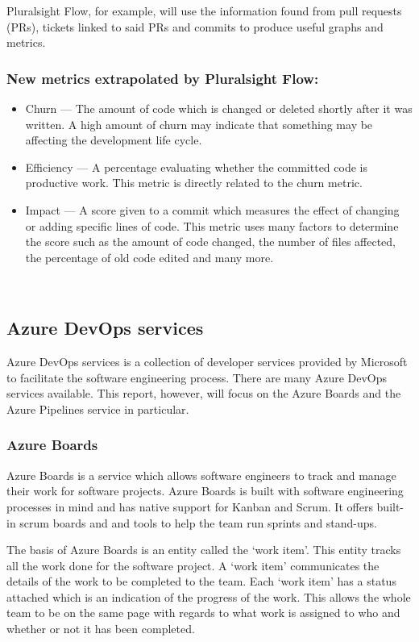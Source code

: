 \documentclass{article}
\begin{document}
Pluralsight Flow, for example, will use the information found from pull
requests (PRs), tickets linked to said PRs and commits to produce useful graphs
and metrics.

\subsubsection{New metrics extrapolated by Pluralsight Flow:}
\begin{itemize}
  \item Churn --- The amount of code which is changed or deleted shortly after
    it was written. A high amount of churn may indicate that something may be
    affecting the development life cycle.
  \item Efficiency --- A percentage evaluating whether the committed code is
    productive work. This metric is directly related to the churn metric.
  \item Impact --- A score given to a commit which measures the effect of
    changing or adding specific lines of code. This metric uses many factors to
    determine the score such as the amount of code changed, the number of files
    affected, the percentage of old code edited and many more.
\end{itemize}
~\cite{plural2019sight2}

\subsection{Azure DevOps services}
Azure DevOps services is a collection of developer services provided by
Microsoft to facilitate the software engineering process. There are many Azure
DevOps services available. This report, however, will focus on the Azure Boards
and the Azure Pipelines service in particular.~\cite{azure2020devops}

\subsubsection{Azure Boards}
Azure Boards is a service which allows software engineers to track and manage
their work for software projects. Azure Boards is built with software
engineering processes in mind and has native support for Kanban and Scrum. It
offers built-in scrum boards and and tools to help the team run sprints and
stand-ups.

The basis of Azure Boards is an entity called the `work item'. This entity
tracks all the work done for the software project. A `work item' communicates
the details of the work to be completed to the team. Each `work item' has a
status attached which is an indication of the progress of the work. This allows
the whole team to be on the same page with regards to what work is assigned to
who and whether or not it has been completed.
\end{document}
